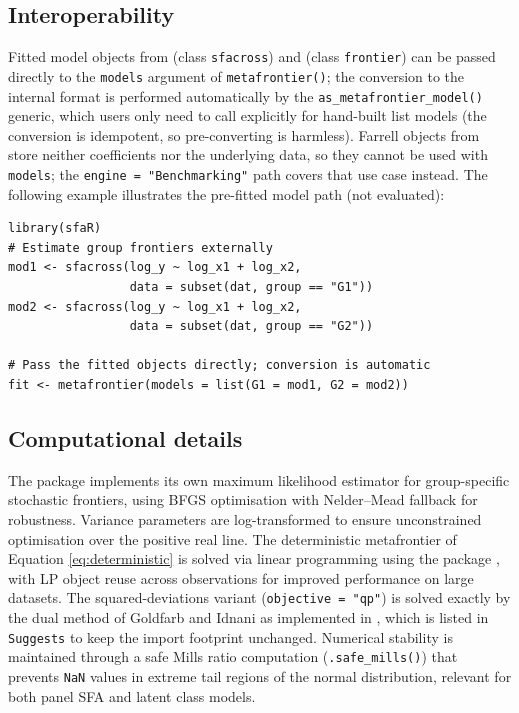 \subsection{Interoperability}\label{sec:interoperability}

Fitted model objects from  (class \texttt{sfacross}) and
 (class \texttt{frontier}) can be passed directly to the
\texttt{models} argument of \texttt{metafrontier()}; the conversion to the internal
format is performed automatically by the \texttt{as\_metafrontier\_model()} generic,
which users only need to call explicitly for hand-built list models (the
conversion is idempotent, so pre-converting is harmless). Farrell objects
from  store neither coefficients nor the underlying
data, so they cannot be used with \texttt{models}; the \texttt{engine\ =\ "Benchmarking"}
path covers that use case instead. The following example illustrates the
pre-fitted model path (not evaluated):

\begin{verbatim}
library(sfaR)
# Estimate group frontiers externally
mod1 <- sfacross(log_y ~ log_x1 + log_x2,
                 data = subset(dat, group == "G1"))
mod2 <- sfacross(log_y ~ log_x1 + log_x2,
                 data = subset(dat, group == "G2"))

# Pass the fitted objects directly; conversion is automatic
fit <- metafrontier(models = list(G1 = mod1, G2 = mod2))
\end{verbatim}

\subsection{Computational details}\label{sec:computational-details}

The package implements its own maximum likelihood estimator for group-specific
stochastic frontiers, using BFGS optimisation with Nelder--Mead fallback for
robustness. Variance parameters are log-transformed to ensure unconstrained
optimisation over the positive real line. The deterministic metafrontier of Equation \eqref{eq:deterministic}
is solved via linear programming using the
 package \citep{lpSolveAPI}, with LP object reuse across
observations for improved performance on large datasets. The squared-deviations
variant (\texttt{objective\ =\ "qp"}) is solved exactly by the dual method of
Goldfarb and Idnani as implemented in  \citep{quadprog}, which
is listed in \texttt{Suggests} to keep the import footprint unchanged. Numerical
stability is maintained through a safe Mills ratio computation
(\texttt{.safe\_mills()}) that prevents \texttt{NaN} values in extreme tail regions of the
normal distribution, relevant for both panel SFA and latent class models.

